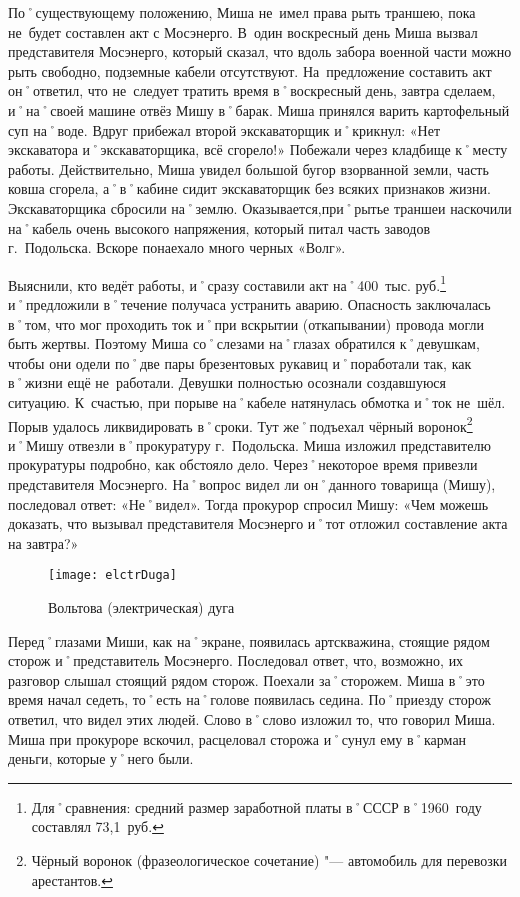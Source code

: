 По˚существующему положению, Миша не~имел права рыть траншею, пока не~будет составлен акт с Мосэнерго. В~один воскресный день Миша вызвал представителя Мосэнерго, который сказал, что вдоль забора военной части можно рыть свободно, подземные кабели отсутствуют. На~предложение составить акт он˚ответил, что не~следует тратить время в˚воскресный день, завтра сделаем, и˚на˚своей машине отвёз Мишу в˚барак. Миша принялся варить картофельный суп на˚воде. Вдруг прибежал второй экскаваторщик и˚крикнул: «Нет экскаватора и˚экскаваторщика, всё сгорело!» Побежали через кладбище к˚месту работы. Действительно, Миша увидел большой бугор взорванной земли, часть ковша сгорела, а˚в˚кабине сидит экскаваторщик без всяких признаков жизни. Экскаваторщика сбросили на˚землю. Оказывается,при˚рытье траншеи наскочили на˚кабель очень высокого напряжения, который питал часть заводов г.~Подольска. Вскоре понаехало много черных «Волг». 

Выяснили, кто ведёт работы, и˚сразу составили акт на˚400~тыс. руб.\footnote{Для˚сравнения: средний размер заработной платы в˚СССР в˚1960~году составлял 73,1~руб.} и˚предложили в˚течение получаса устранить аварию. Опасность заключалась в˚том, что мог проходить ток и˚при вскрытии (откапывании) провода могли быть жертвы. Поэтому Миша со˚слезами на˚глазах обратился к˚девушкам, чтобы они одели по˚две пары брезентовых рукавиц и˚поработали так, как в˚жизни ещё не~работали. Девушки полностью осознали создавшуюся ситуацию. К~счастью, при порыве на˚кабеле натянулась обмотка и˚ток не~шёл. Порыв удалось ликвидировать в˚сроки. Тут же˚подъехал чёрный воронок\footnote{Чёрный воронок (фразеологическое сочетание) "--- автомобиль для перевозки арестантов.} и˚Мишу отвезли в˚прокуратуру г.~Подольска. Миша изложил представителю прокуратуры подробно, как обстояло дело. Через˚некоторое время привезли представителя Мосэнерго. На˚вопрос видел ли он˚данного товарища (Мишу), последовал ответ: «Не˚видел». Тогда прокурор спросил Мишу: «Чем можешь доказать, что вызывал представителя Мосэнерго и˚тот отложил составление акта на завтра?» 

\begin{wrapfigure}{O}{.4\textwidth}
\centering
\texttt{[image: elctrDuga]}
\caption{Вольтова (электрическая) дуга}
\label{fig:elctrDuga}
\end{wrapfigure}
Перед˚глазами Миши, как на˚экране, появилась артскважина, стоящие рядом сторож и˚представитель Мосэнерго. Последовал ответ, что, возможно, их разговор слышал стоящий рядом сторож. Поехали за˚сторожем. Миша в˚это время начал седеть, то˚есть на˚голове появилась седина. По˚приезду сторож ответил, что видел этих людей. Слово в˚слово изложил то, что говорил Миша. Миша при прокуроре вскочил, расцеловал сторожа и˚сунул ему в˚карман деньги, которые у˚него были.

